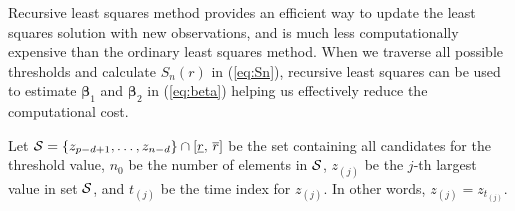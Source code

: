  Recursive least squares method provides an efficient way to update the least squares solution with new observations, and is much less computationally expensive than the ordinary least squares method. When we traverse all possible thresholds and calculate $S_n(r)$ in (\ref{eq:Sn}),  recursive least squares can be used to estimate $\boldsymbol{\beta}_1$ and $\boldsymbol{\beta}_2$ in (\ref{eq:beta}) helping us effectively reduce the computational cost. 


Let ${\cal S}=\{{z}_{p-d+1},\ldots,{z}_{n-d}\}\cap [\underline{r},\, \overline{r}]$ be the set containing all candidates for the threshold value, $n_0$ be the number of elements in $\cal S$, ${z}_{(j)}$ be the $j$-th largest value in set $\cal S$, and $t_{(j)}$ be the time index for ${z}_{(j)}$. In other words, ${z}_{(j)}=z_{t_{(j)}}$.


